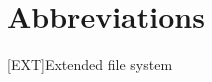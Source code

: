 \documentclass[
11pt,
liststotoc,
bibtotocnumbered,
headheight=34pt     %
]{scrartcl}             %
\newcommand{\centeredpart}[1]{
	\newpage
	\vspace*{\fill}
	\part{#1}
	\vspace*{\fill}
	\newpage
}
\begin{document}
	
	\newpage
	
	\tableofcontents
	\clearpage
	
	\newpage
	

	

	
	\newpage
	\section{Abbreviations}
	\begin{acronym}[SMTP] %
		[EXT]{Extended file system}		
		
		
	\end{acronym}
	
	
	\newpage
	
	\printbibliography
	
	\appendix
	
		
		
		
	
\end{document}

